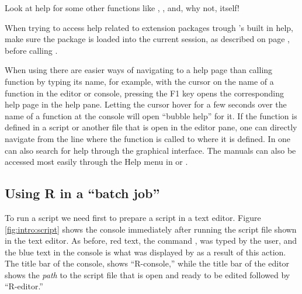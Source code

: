 \documentclass[krantz2]{krantz}\usepackage{knitr}
\begin{document}
\begin{playground}
Look at help for some other functions like , ,  and, why not,  itself!

\begin{knitrout}\footnotesize
{}\color{fgcolor}\begin{kframe}
\begin{alltt}
\end{alltt}
\end{kframe}
\end{knitrout}
\end{playground}

\begin{warningbox}
When trying to access help related to \Rlang extension packages trough \Rlang's built in help, make sure the package is loaded into the current \Rlang session, as described on page \pageref{sec:packages:install}, before calling .
\end{warningbox}

When using \RStudio there are easier ways of navigating to a help page than calling function  by typing its name, for example, with the cursor on the name of a function in the editor or console, pressing the \textsf{F1} key opens the corresponding help page in the help pane. Letting the cursor hover for a few seconds over the name of a function at the \Rpgrm console will open ``bubble help'' for it. If the function is defined in a script or another file that is open in the editor pane, one can directly navigate from the line where the function is called to where it is defined. In \RStudio one can also search for help through the graphical interface. The \Rlang manuals can also be accessed most easily through the Help menu in \RStudio or .

\subsection{Using R in a ``batch job''}

To run a script we need first to prepare a script in a text editor. Figure \ref{fig:intro:script} shows the console immediately after running the script file shown in the text editor. As before, red text, the command , was typed by the user, and the blue text in the console is what was displayed by \Rpgrm as a result of this action. The title bar of the console, shows ``R-console,'' while the title bar of the editor shows the \emph{path} to the script file that is open and ready to be edited followed by ``R-editor.''
\end{document}
